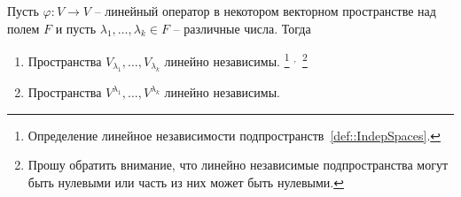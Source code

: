 \begin{claim}
\label{claim::EigenRootInd}
Пусть $\varphi\colon V\to V$ -- линейный оператор в некотором векторном пространстве над полем $F$ и пусть $\lambda_1,\ldots,\lambda_k\in F$ -- различные числа.
Тогда
\begin{enumerate}
\item Пространства $V_{\lambda_1},\ldots,V_{\lambda_k}$ линейно независимы.%
\footnote{Определение линейное независимости подпространств~\ref{def::IndepSpaces}.}%
${}^{,\,}$%
\footnote{Прошу обратить внимание, что линейно независимые подпространства могут быть нулевыми или часть из них может быть нулевыми.}

\item Пространства $V^{\lambda_1},\ldots,V^{\lambda_k}$ линейно независимы.
\end{enumerate}
\end{claim}
